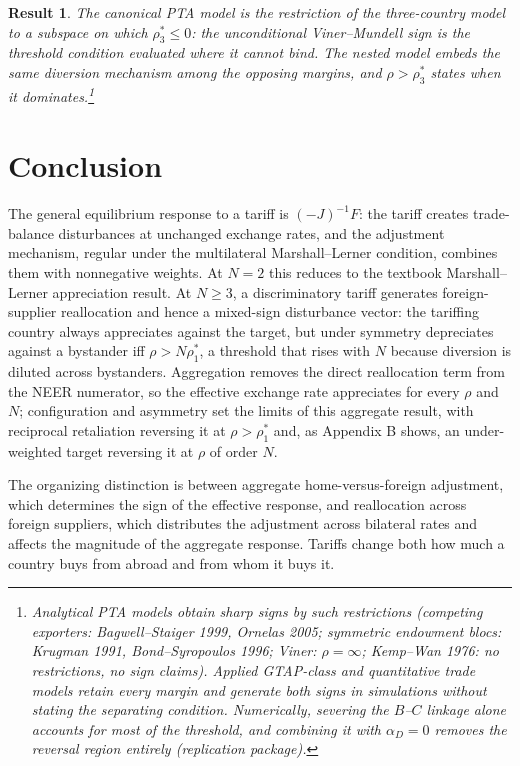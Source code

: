 \documentclass[11pt]{article}
\newtheorem{result}{Result}[section]
\begin{document}
\begin{result}
The canonical PTA model is the restriction of the three-country model to a subspace on which $\rho_3^* \leq 0$: the unconditional Viner--Mundell sign is the threshold condition evaluated where it cannot bind. The nested model embeds the same diversion mechanism among the opposing margins, and $\rho > \rho_3^*$ states when it dominates.\footnote{Analytical PTA models obtain sharp signs by such restrictions (competing exporters: Bagwell--Staiger 1999, Ornelas 2005; symmetric endowment blocs: Krugman 1991, Bond--Syropoulos 1996; Viner: $\rho = \infty$; Kemp--Wan 1976: no restrictions, no sign claims). Applied GTAP-class and quantitative trade models retain every margin and generate both signs in simulations without stating the separating condition. Numerically, severing the $B$--$C$ linkage alone accounts for most of the threshold, and combining it with $\alpha_D = 0$ removes the reversal region entirely (replication package).}
\label{res:pta}
\end{result}

\section{Conclusion}

The general equilibrium response to a tariff is $(-J)^{-1}F$: the tariff creates trade-balance disturbances at unchanged exchange rates, and the adjustment mechanism, regular under the multilateral Marshall--Lerner condition, combines them with nonnegative weights. At $N = 2$ this reduces to the textbook Marshall--Lerner appreciation result. At $N \geq 3$, a discriminatory tariff generates foreign-supplier reallocation and hence a mixed-sign disturbance vector: the tariffing country always appreciates against the target, but under symmetry depreciates against a bystander iff $\rho > N\rho_1^*$, a threshold that rises with $N$ because diversion is diluted across bystanders. Aggregation removes the direct reallocation term from the NEER numerator, so the effective exchange rate appreciates for every $\rho$ and $N$; configuration and asymmetry set the limits of this aggregate result, with reciprocal retaliation reversing it at $\rho > \rho_1^*$ and, as Appendix B shows, an under-weighted target reversing it at $\rho$ of order $N$.

The organizing distinction is between aggregate home-versus-foreign adjustment, which determines the sign of the effective response, and reallocation across foreign suppliers, which distributes the adjustment across bilateral rates and affects the magnitude of the aggregate response. Tariffs change both how much a country buys from abroad and from whom it buys it.
\end{document}
